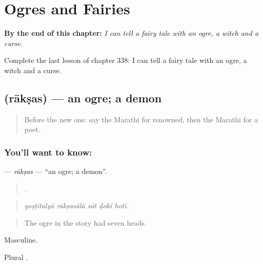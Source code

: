 
\chapter{Ogres and Fairies}
\label{ch:mr-ogres-and-fairies}

\begin{chapteropening}
\textbf{By the end of this chapter:} \emph{I can tell a fairy tale with an ogre, a witch and a curse.}

Complete the last lesson of chapter 338: I can tell a fairy tale with an ogre, a witch and a curse.
\end{chapteropening}

\section[\texorpdfstring{\mr{राक्षस} (rākṣas)}{राक्षस (rākṣas)}]{ (rākṣas) — an ogre; a demon}

\label{lesson:MR-C338-raksas}



\begin{quote}
Before the new one: say the Marathi for renowned, then the Marathi for a poet.
\end{quote}

\subsection*{You'll want to know: }
\textbf{} — \emph{rākṣas} — \textquotedblleft{}an ogre; a demon\textquotedblright{}.

\begin{quote}
    .
\end{quote}

\begin{quote}
\emph{goṣṭītalyā rākṣasālā sāt ḍokī hotī.}
\end{quote}

\begin{quote}
The ogre in the story had seven heads.
\end{quote}

Masculine.

Plural .

